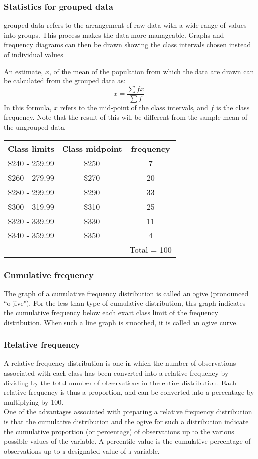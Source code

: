 \documentclass{beamer}
\begin{document}
\begin{frame}
\frametitle{Statistics for grouped data}
grouped data refers to the arrangement of raw data with a wide range of values into groups. This process makes the data more manageable. Graphs and frequency diagrams can then be drawn showing the class intervals chosen instead of individual values.


\noindent An estimate, $\bar{x}$, of the mean of the population from which the data are drawn can be calculated from the grouped data as:
\[ \bar{x} = \frac{\sum f x }{\sum f}\]
In this formula, $x$ refers to the mid-point of the class intervals, and $f$ is the class frequency. Note that the result of this will be different from the sample mean of the ungrouped data.

\end{frame}
\begin{frame}
\begin{tabular}{|c|c|c|}
\hline
Class limits& Class midpoint & frequency \\
  \hline
\$240 - 259.99 & \$250 &7\\
\$260 - 279.99 & \$270 &20\\
\$280 - 299.99 & \$290 &33\\
\$300 - 319.99 & \$310 &25\\
\$320 - 339.99 & \$330 &11\\
\$340 - 359.99 & \$350 &4\\
\hline
& & Total = 100\\
  \hline
\end{tabular}
\end{frame}

\begin{frame}
\frametitle{Cumulative frequency}
The graph of a cumulative frequency distribution is called an ogive (pronounced ``o-jive"). For the less-than
type of cumulative distribution, this graph indicates the cumulative frequency below each exact class limit of
the frequency distribution. When such a line graph is smoothed, it is called an ogive curve.
\end{frame}

\begin{frame}
\frametitle{Relative frequency}
A relative frequency distribution is one in which the number of observations associated with each class has
been converted into a relative frequency by dividing by the total number of observations in the entire
distribution. Each relative frequency is thus a proportion, and can be converted into a percentage by multiplying
by 100.\\

\noindent One of the advantages associated with preparing a relative frequency distribution is that the cumulative
distribution and the ogive for such a distribution indicate the cumulative proportion (or percentage) of
observations up to the various possible values of the variable. A percentile value is the cumulative percentage of
observations up to a designated value of a variable.
\end{frame}
\end{document}
